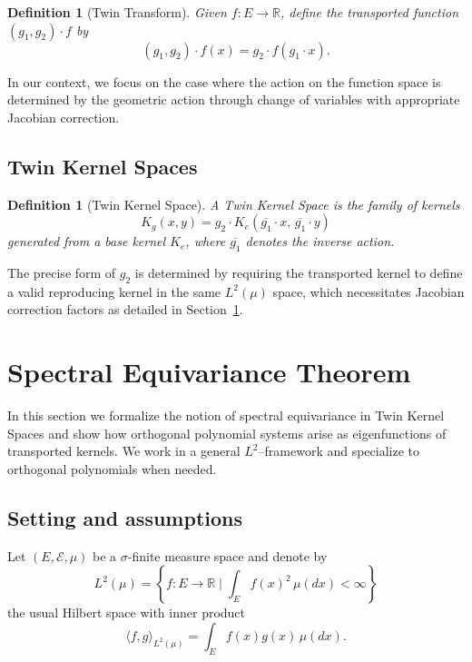 \documentclass[11pt,a4paper]{article}
\newtheorem{definition}[theorem]{Definition}
\newcommand{\R}{\mathbb{R}}
\newcommand{\ip}[2]{\langle #1, #2 \rangle}
\begin{document}
\begin{definition}[Twin Transform]\label{def:twin_transform}
Given $f : E \to \R$, define the \emph{transported function} $(g_1, g_2) \cdot f$ by
\[
(g_1, g_2) \cdot f(x) = g_2 \cdot f(g_1 \cdot x).
\]
\end{definition}

In our context, we focus on the case where the action on the function space is determined by the geometric action through change of variables with appropriate Jacobian correction.

\subsection{Twin Kernel Spaces}

\begin{definition}[Twin Kernel Space]\label{def:twin_kernel_space}
A \emph{Twin Kernel Space} is the family of kernels
\[
K_g(x, y) = g_2 \cdot K_e(\overline{g_1} \cdot x, \, \overline{g_1} \cdot y)
\]
generated from a base kernel $K_e$, where $\overline{g_1}$ denotes the inverse action.
\end{definition}

The precise form of $g_2$ is determined by requiring the transported kernel to define a valid reproducing kernel in the same $L^2(\mu)$ space, which necessitates Jacobian correction factors as detailed in Section~\ref{sec:spectral}.

\section{Spectral Equivariance Theorem}\label{sec:spectral}

In this section we formalize the notion of spectral equivariance in Twin Kernel Spaces and show how orthogonal polynomial systems arise as eigenfunctions of transported kernels. We work in a general $L^2$--framework and specialize to orthogonal polynomials when needed.

\subsection{Setting and assumptions}

Let $(E, \mathcal{E}, \mu)$ be a $\sigma$-finite measure space and denote by
\[
L^2(\mu) = \left\{ f : E \to \R \;\Big|\; \int_E f(x)^2 \, \mu(dx) < \infty \right\}
\]
the usual Hilbert space with inner product
\[
\ip{f}{g}_{L^2(\mu)} = \int_E f(x) g(x) \, \mu(dx).
\]
\end{document}
